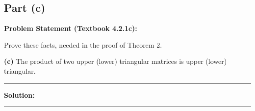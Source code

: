 \clearpage
\subsection*{Part (c)}

\textbf{Problem Statement (Textbook 4.2.1c):} 

Prove these facts, needed in the proof of Theorem 2.

\textbf{(c)} The product of two upper (lower) triangular matrices is upper (lower) triangular.

\noindent\rule{\textwidth}{0.4pt}

\vspace{1em}

\textbf{Solution:}


\vspace{2em}
\noindent\rule{\textwidth}{0.4pt}
